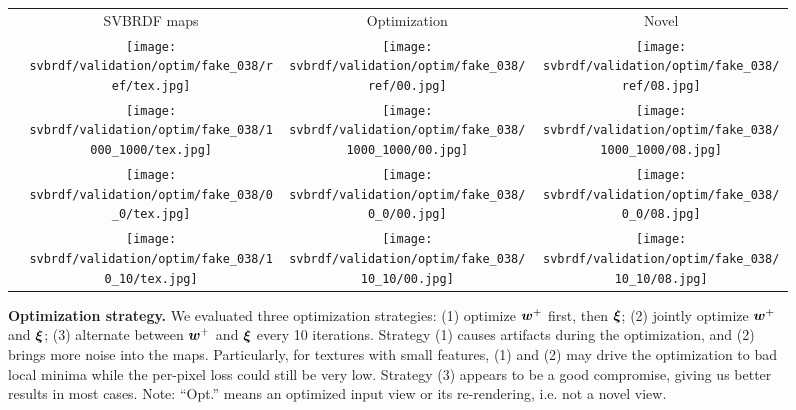\begin{figure}[h]
	\centering
	\setlength{\resLen}{1.in}
	\setlength{\raiseLen}{0.4in}
	\addtolength{\tabcolsep}{-4pt}
	\begin{tabular}{cccc}
		  & SVBRDF maps & Optimization & Novel
		\\
		\raisebox{\raiseLen}{\rotatebox[origin=c]{90}{GT}} &
		\texttt{[image: svbrdf/validation/optim/fake\_038/ref/tex.jpg]} &
		\texttt{[image: svbrdf/validation/optim/fake\_038/ref/00.jpg]} &
		\texttt{[image: svbrdf/validation/optim/fake\_038/ref/08.jpg]}
		\\
		\raisebox{\raiseLen}{\rotatebox[origin=c]{0}{(1)}} &
		\texttt{[image: svbrdf/validation/optim/fake\_038/1000\_1000/tex.jpg]} &
		\texttt{[image: svbrdf/validation/optim/fake\_038/1000\_1000/00.jpg]} &
		\texttt{[image: svbrdf/validation/optim/fake\_038/1000\_1000/08.jpg]}
		\\
		\raisebox{\raiseLen}{\rotatebox[origin=c]{0}{(2)}} &
		\texttt{[image: svbrdf/validation/optim/fake\_038/0\_0/tex.jpg]} &
		\texttt{[image: svbrdf/validation/optim/fake\_038/0\_0/00.jpg]} &
		\texttt{[image: svbrdf/validation/optim/fake\_038/0\_0/08.jpg]}
		\\
		\raisebox{\raiseLen}{\rotatebox[origin=c]{0}{(3)}} &
		\texttt{[image: svbrdf/validation/optim/fake\_038/10\_10/tex.jpg]} &
		\texttt{[image: svbrdf/validation/optim/fake\_038/10\_10/00.jpg]} &
		\texttt{[image: svbrdf/validation/optim/fake\_038/10\_10/08.jpg]}
	\end{tabular}
	\caption[Optimization strategy]{\label{fig:svbrdf:strategy}
		\textbf{Optimization strategy.} We evaluated three optimization strategies: (1) optimize $\bm{w}^+$ first, then $\bm{\xi}$; (2) jointly optimize $\bm{w}^+$ and $\bm{\xi}$; (3) alternate between $\bm{w}^+$ and $\bm{\xi}$ every 10 iterations. Strategy (1) causes artifacts during the optimization, and (2) brings more noise into the maps. Particularly, for textures with small features, (1) and (2) may drive the optimization to bad local minima while the per-pixel loss could still be very low. Strategy (3) appears to be a good compromise, giving us better results in most cases. Note: ``Opt.'' means an  optimized input view or its re-rendering, i.e. not a novel view.
	}
\end{figure}
